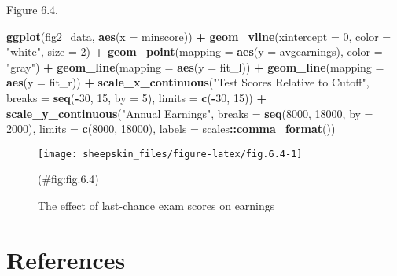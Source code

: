 \documentclass[]{book}
\newenvironment{Shaded}{\begin{snugshade}}{\end{snugshade}}
\newcommand{\KeywordTok}[1]{\textcolor[rgb]{0.13,0.29,0.53}{\textbf{#1}}}
\newcommand{\DataTypeTok}[1]{\textcolor[rgb]{0.13,0.29,0.53}{#1}}
\newcommand{\DecValTok}[1]{\textcolor[rgb]{0.00,0.00,0.81}{#1}}
\newcommand{\StringTok}[1]{\textcolor[rgb]{0.31,0.60,0.02}{#1}}
\newcommand{\OperatorTok}[1]{\textcolor[rgb]{0.81,0.36,0.00}{\textbf{#1}}}
\newcommand{\NormalTok}[1]{#1}
\theoremstyle{definition}
\theoremstyle{definition}
\theoremstyle{definition}
\theoremstyle{remark}
\begin{document}
Figure 6.4.

\begin{Shaded}
\begin{Highlighting}[]
\KeywordTok{ggplot}\NormalTok{(fig2_data, }\KeywordTok{aes}\NormalTok{(}\DataTypeTok{x =}\NormalTok{ minscore)) }\OperatorTok{+}
\StringTok{  }\KeywordTok{geom_vline}\NormalTok{(}\DataTypeTok{xintercept =} \DecValTok{0}\NormalTok{, }\DataTypeTok{color =} \StringTok{"white"}\NormalTok{, }\DataTypeTok{size =} \DecValTok{2}\NormalTok{) }\OperatorTok{+}
\StringTok{  }\KeywordTok{geom_point}\NormalTok{(}\DataTypeTok{mapping =} \KeywordTok{aes}\NormalTok{(}\DataTypeTok{y =}\NormalTok{ avgearnings), }\DataTypeTok{color =} \StringTok{"gray"}\NormalTok{) }\OperatorTok{+}
\StringTok{  }\KeywordTok{geom_line}\NormalTok{(}\DataTypeTok{mapping =} \KeywordTok{aes}\NormalTok{(}\DataTypeTok{y =}\NormalTok{ fit_l)) }\OperatorTok{+}
\StringTok{  }\KeywordTok{geom_line}\NormalTok{(}\DataTypeTok{mapping =} \KeywordTok{aes}\NormalTok{(}\DataTypeTok{y =}\NormalTok{ fit_r)) }\OperatorTok{+}
\StringTok{  }\KeywordTok{scale_x_continuous}\NormalTok{(}\StringTok{"Test Scores Relative to Cutoff"}\NormalTok{,}
                     \DataTypeTok{breaks =} \KeywordTok{seq}\NormalTok{(}\OperatorTok{-}\DecValTok{30}\NormalTok{, }\DecValTok{15}\NormalTok{, }\DataTypeTok{by =} \DecValTok{5}\NormalTok{), }\DataTypeTok{limits =} \KeywordTok{c}\NormalTok{(}\OperatorTok{-}\DecValTok{30}\NormalTok{, }\DecValTok{15}\NormalTok{)) }\OperatorTok{+}
\StringTok{  }\KeywordTok{scale_y_continuous}\NormalTok{(}\StringTok{"Annual Earnings"}\NormalTok{, }\DataTypeTok{breaks =} \KeywordTok{seq}\NormalTok{(}\DecValTok{8000}\NormalTok{, }\DecValTok{18000}\NormalTok{, }\DataTypeTok{by =} \DecValTok{2000}\NormalTok{),}
                     \DataTypeTok{limits =} \KeywordTok{c}\NormalTok{(}\DecValTok{8000}\NormalTok{, }\DecValTok{18000}\NormalTok{), }\DataTypeTok{labels =}\NormalTok{ scales}\OperatorTok{::}\KeywordTok{comma_format}\NormalTok{())}
\end{Highlighting}
\end{Shaded}

\begin{figure}

{\centering \texttt{[image: sheepskin\_files/figure-latex/fig.6.4-1]} 

}

\caption{The effect of last-chance exam scores on earnings}(\#fig:fig.6.4)
\end{figure}

\section*{References}\label{references-9}
\end{document}
